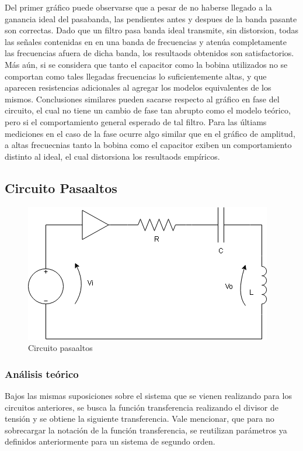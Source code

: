 Del primer gráfico puede observarse que a pesar de no haberse llegado a la ganancia ideal del pasabanda, las pendientes antes y despues de la banda pasante son correctas. Dado que un filtro pasa banda ideal transmite, sin distorsion, todas las señales contenidas en en una banda de frecuencias y atenúa completamente las frecuencias afuera de dicha banda, los resultaods obtenidos son satisfactorios. Más aún, si se considera que tanto el capacitor como la bobina utilizados no se comportan como tales llegadas frecuencias lo suficientemente altas, y que aparecen resistencias adicionales al agregar los modelos equivalentes de los mismos. Conclusiones similares pueden sacarse respecto al gráfico en fase del circuito, el cual no tiene un cambio de fase tan abrupto como el modelo teórico, pero si el comportamiento general esperado de tal filtro. Para las últiams mediciones en el caso de la fase ocurre algo similar que en el gráfico de amplitud, a altas frecuecnias tanto la bobina como el capacitor exiben un comportamiento distinto al ideal, el cual distorsiona los resultaods empíricos. 



\subsection{Circuito Pasaaltos}

\begin{figure}[H]
    \centering
    \includegraphics[scale=0.5]{Recursos/circuito_pasaaltos.png}
    \caption{Circuito pasaaltos}
    \label{fig:circuito_pasaaltos}
\end{figure}

\subsubsection{An\'alisis te\'orico}
Bajos las mismas suposiciones sobre el sistema que se vienen realizando para los circuitos anteriores,
se busca la funci\'on transferencia realizando el divisor de tensi\'on y se obtiene la siguiente transferencia. Vale mencionar,
que para no sobrecargar la notaci\'on de la funci\'on transferencia, se reutilizan par\'ametros ya definidos anteriormente
para un sistema de segundo orden.

